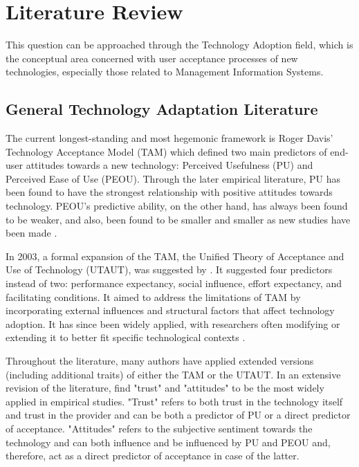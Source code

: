 \section{Literature Review}
This question can be approached through the Technology Adoption field, which is the conceptual area concerned with user acceptance processes of new technologies, especially those related to Management Information Systems.

\subsection{General Technology Adaptation Literature}
The current longest-standing and most hegemonic framework is Roger Davis' Technology Acceptance Model (TAM) which defined two main predictors of end-user attitudes towards a new technology: Perceived Usefulness (PU) and Perceived Ease of Use (PEOU). Through the later empirical literature, PU has been found to have the strongest relationship with positive attitudes towards technology. PEOU's predictive ability, on the other hand, has always been found to be weaker, and also, been found to be smaller and smaller as new studies have been made \parencite{davis_technology_1985, davis_perceived_1989, kelly_what_2023}.

In 2003, a formal expansion of the TAM, the Unified Theory of Acceptance and Use of Technology (UTAUT), was suggested by \textcite{venkatesh_user_2003}. It suggested four predictors instead of two: performance expectancy, social influence, effort expectancy, and facilitating conditions. It aimed to address the limitations of TAM by incorporating external influences and structural factors that affect technology adoption. It has since been widely applied, with researchers often modifying or extending it to better fit specific technological contexts \parencite{venkatesh_user_2003, hasan_emon_insights_2023}.

Throughout the literature, many authors have applied extended versions (including additional traits) of either the TAM or the UTAUT. In an extensive revision of the literature, \textcite{kelly_what_2023} find "trust" and "attitudes" to be the most widely applied in empirical studies. "Trust" refers to both trust in the technology itself and trust in the provider and can be both a predictor of PU or a direct predictor of acceptance. "Attitudes" refers to the subjective sentiment towards the technology and can both influence and be influenced by PU and PEOU and, therefore, act as a direct predictor of acceptance in case of the latter.

